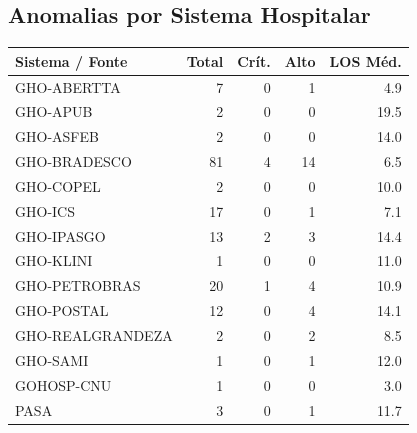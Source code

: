 \documentclass[a4paper,10pt]{article}
\begin{document}
\subsection{Anomalias por Sistema Hospitalar}
\begin{center}
\begin{longtable}{lrrrr}
\toprule
\textbf{Sistema / Fonte} & \textbf{Total} & \textbf{Cr\'{i}t.} & \textbf{Alto} & \textbf{LOS M\'{e}d.} \\
\midrule
\endhead
\bottomrule
\endfoot

GHO-ABERTTA & 7 & \textcolor{anomred}{0} & \textcolor{anomorange}{1} & 4.9 \\

GHO-APUB & 2 & \textcolor{anomred}{0} & \textcolor{anomorange}{0} & 19.5 \\

GHO-ASFEB & 2 & \textcolor{anomred}{0} & \textcolor{anomorange}{0} & 14.0 \\

GHO-BRADESCO & 81 & \textcolor{anomred}{4} & \textcolor{anomorange}{14} & 6.5 \\

GHO-COPEL & 2 & \textcolor{anomred}{0} & \textcolor{anomorange}{0} & 10.0 \\

GHO-ICS & 17 & \textcolor{anomred}{0} & \textcolor{anomorange}{1} & 7.1 \\

GHO-IPASGO & 13 & \textcolor{anomred}{2} & \textcolor{anomorange}{3} & 14.4 \\

GHO-KLINI & 1 & \textcolor{anomred}{0} & \textcolor{anomorange}{0} & 11.0 \\

GHO-PETROBRAS & 20 & \textcolor{anomred}{1} & \textcolor{anomorange}{4} & 10.9 \\

GHO-POSTAL & 12 & \textcolor{anomred}{0} & \textcolor{anomorange}{4} & 14.1 \\

GHO-REALGRANDEZA & 2 & \textcolor{anomred}{0} & \textcolor{anomorange}{2} & 8.5 \\

GHO-SAMI & 1 & \textcolor{anomred}{0} & \textcolor{anomorange}{1} & 12.0 \\

GOHOSP-CNU & 1 & \textcolor{anomred}{0} & \textcolor{anomorange}{0} & 3.0 \\

PASA & 3 & \textcolor{anomred}{0} & \textcolor{anomorange}{1} & 11.7 \\

\end{longtable}\end{center}
\end{document}
